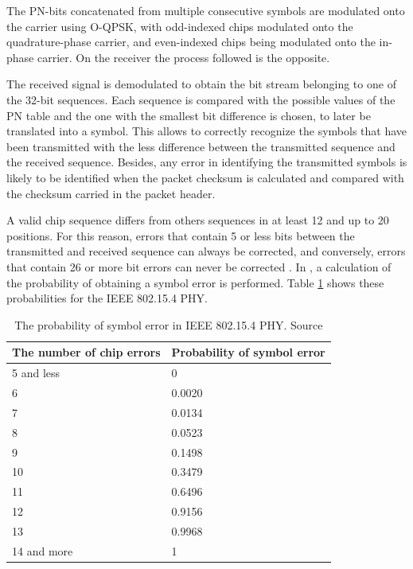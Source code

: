 \documentclass[journal]{IEEEtran}	%
\begin{document}
The PN-bits concatenated from multiple consecutive symbols are modulated onto the carrier using O-QPSK, with odd-indexed chips modulated onto the quadrature-phase carrier, and even-indexed chips being modulated onto the in-phase carrier. On the receiver the process followed is the opposite.

The received signal is demodulated to obtain the bit stream belonging to one of the 32-bit sequences. Each sequence is compared with the possible values of the PN table and the one with the smallest bit difference is chosen, to later be translated into a symbol. This allows to correctly recognize the symbols that have been transmitted with the less difference between the transmitted sequence and the received sequence. Besides, any error in identifying the transmitted symbols is likely to be identified when the packet checksum is calculated and compared with the checksum carried in the packet header.

A valid chip sequence differs from others sequences in at least 12 and up to 20 positions. For this reason, errors that contain 5 or less bits between the transmitted and received sequence can always be corrected, and conversely, errors that contain 26 or more bit errors can never be corrected \cite{goyal2010evaluating}. In \cite{goyal2010evaluating}, a calculation of the probability of obtaining a symbol error is performed. Table \ref{tab:probability} shows these probabilities for the IEEE 802.15.4 PHY.

\begin{table}[t!]
    \renewcommand{\arraystretch}{1.25}		%
    \centering
    \caption{The probability of symbol error in IEEE 802.15.4 PHY. Source \cite{goyal2010evaluating}}	%
    \label{tab:probability}
    \begin{tabular}{l|l}					%
    \hline \hline
    \textbf{The number of chip errors}        &    \textbf{Probability of symbol error}\\
    \hline
    5 and less          &   0\\
    6                   &   0.0020\\
    7                   &   0.0134\\
    8                   &   0.0523\\
    9                   &   0.1498\\
    10                  &   0.3479\\
    11                  &   0.6496\\
    12                  &   0.9156\\
    13                  &   0.9968\\
    14 and more         &   1\\
    \hline \hline
    \end{tabular}
\end{table}
\end{document}
